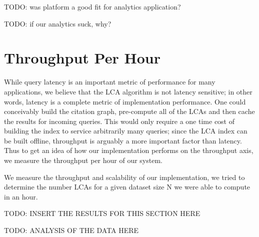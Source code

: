 \documentclass{article}
\begin{document}
TODO: was platform a good fit for analytics application?

TODO: if our analytics suck, why?

\section{Throughput Per Hour}

While query latency is an important metric of performance for many applications, we believe that the LCA algorithm is not latency sensitive; in other words, latency is a complete metric of implementation performance.
One could conceivably build the citation graph, pre-compute all of the LCAs and then cache the results for incoming queries.
This would only require a one time cost of building the index to service arbitrarily many queries; since the LCA index can be built offline, throughput is arguably a more important factor than latency.
Thus to get an idea of how our implementation performs on the throughput axis, we measure the throughput per hour of our system.

We measure the throughput and scalability of our implementation, we tried to determine the number LCAs for a given dataset size N we were able to compute in an hour.

TODO: INSERT THE RESULTS FOR THIS SECTION HERE

TODO: ANALYSIS OF THE DATA HERE
\end{document}
